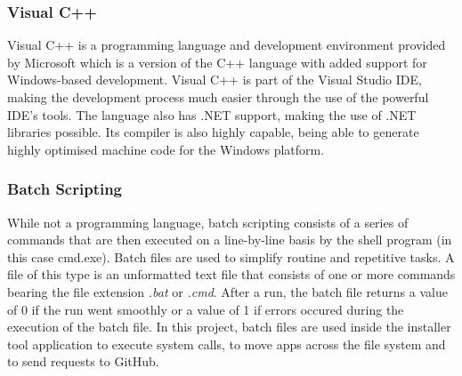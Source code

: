 \subsubsection{Visual C++}
Visual C++ is a programming language and development environment provided by Microsoft which is a version of the C++ language with added support for Windows-based development. Visual C++ is part of the Visual Studio IDE, making the development process much easier through the use of the powerful IDE's tools. The language also has .NET support, making the use of .NET libraries possible. Its compiler is also highly capable, being able to generate highly optimised machine code for the Windows platform.

\subsubsection{Batch Scripting}
While not a programming language, batch scripting consists of a series of commands that are then executed on a line-by-line basis by the shell program (in this case cmd.exe). Batch files are used to simplify routine and repetitive tasks. A file of this type is an unformatted text file that consists of one or more commands bearing the file extension \textit{.bat} or \textit{.cmd}. After a run, the batch file returns a value of 0 if the run went smoothly or a value of 1 if errors occured during the execution of the batch file\cite{batch_files}. In this project, batch files are used inside the installer tool application to execute system calls, to move apps across the file system and to send requests to GitHub.
\vspace{\baselineskip}\newline


